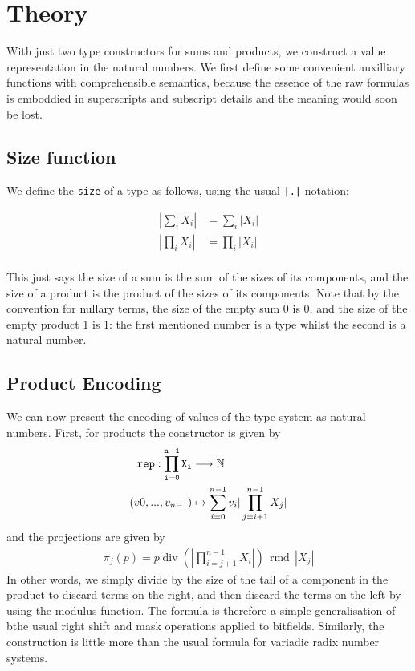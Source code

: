 \documentclass{article}
\DeclareMathOperator{\quot}{div}
\DeclareMathOperator{\rmd}{rmd}
\begin{document}
\section{Theory}
With just two type constructors for sums and products, we construct a value
representation in the natural numbers. We first define some convenient 
auxilliary functions with comprehensible semantics, because the essence
of the raw formulas is emboddied in superscripts and subscript details
and the meaning would soon be lost.

\subsection{Size function}
We define the \verb$size$ of a type as follows, using the usual \verb$|.|$ notation:

\begin{align*}
|\sum_iX_i| &= \sum_i|X_i|\\
|\prod_iX_i| &= \prod_i|X_i|\\
\end{align*}

This just says the size of a sum is the sum of the sizes of its components,
and the size of a product is the product of the sizes of its components.
Note that by the convention for nullary terms, the size of the empty sum 0
is 0, and the size of the empty product 1 is 1: the first mentioned number
is a type whilst the second is a natural number.

\subsection{Product Encoding}
We can now present the encoding of values of the type system as natural numbers.
First, for products the constructor is given by
\begin{align*}
\tt{rep}: \prod_{i=0}^{n-1}X_i &\longrightarrow \mathbb{N}\\
(v0, ... ,v_{n-1}) &\mapsto \sum_{i=0}^{n-1}v_i | \prod_{j=i+1}^{n-1} X_j|
\end{align*}
and the projections are given by
\begin{align*}
\pi_j (p) = p \quot (|\prod_{i=j+1}^{n-1}X_i|) \, \rmd \, |X_j|
\end{align*}
In other words, we simply divide by the size of the tail of a component
in the product to discard terms on the right, and then discard the terms
on the left by using the modulus function.  The formula is therefore
a simple generalisation of bthe usual right shift and mask operations
applied to bitfields. Similarly, the construction is little more
than the usual formula for variadic radix number systems.
\end{document}
